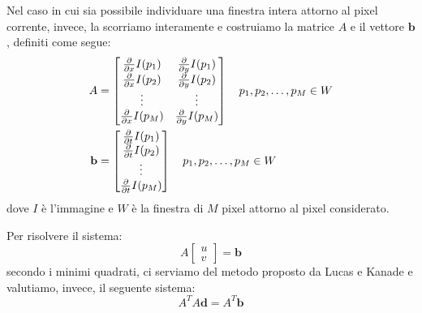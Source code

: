 \documentclass[11pt, twocolumn]{article}
\begin{document}
Nel caso in cui sia possibile individuare una finestra intera attorno al pixel corrente, invece, la scorriamo interamente e costruiamo la matrice $A$ e il vettore $\mathbf{b}$, definiti come segue:
\begin{align}
A &= \begin{bmatrix}
{\partial \over \partial x}I(p_1) & {\partial \over \partial y}I(p_1) \\
{\partial \over \partial x}I(p_2) & {\partial \over \partial y}I(p_2) \\
\vdots & \vdots \\
{\partial \over \partial x}I(p_M) & {\partial \over \partial y}I(p_M)
\end{bmatrix} \quad p_1, p_2, \ldots, p_M \in W \\
\mathbf{b} &=  \begin{bmatrix}
{\partial \over \partial t}I(p_1) \\
{\partial \over \partial t}I(p_2) \\
\vdots \\
{\partial \over \partial t}I(p_M) \\
\end{bmatrix} \quad p_1, p_2, \ldots, p_M \in W
\end{align}
dove $I$ è l'immagine e $W$ è la finestra di $M$ pixel attorno al pixel considerato.

Per risolvere il sistema:
\begin{equation}
A \begin{bmatrix}
u \\
v
\end{bmatrix} = \mathbf{b}
\end{equation}
secondo i minimi quadrati, ci serviamo del metodo proposto da Lucas e Kanade e valutiamo, invece, il seguente sistema:
\begin{equation}
A^T A \mathbf{d} = A^T \mathbf{b}
\end{equation}
\end{document}
